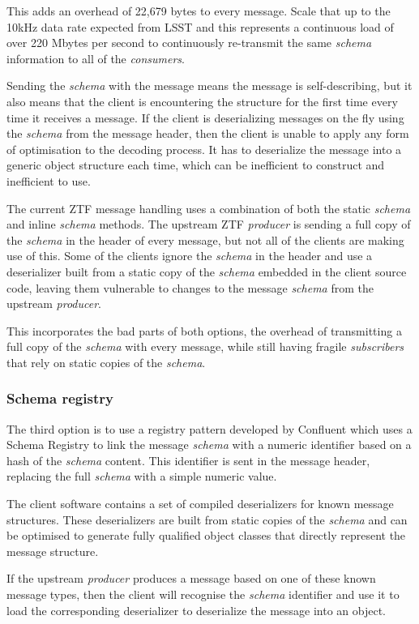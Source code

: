 \documentclass{article}
\newcommand{\kfconsumers} {\textit{consumers}\xspace}
\newcommand{\kfproducer} {\textit{producer}\xspace}
\newcommand{\kfsubscribers} {\textit{subscribers}\xspace}
\newcommand{\confluent} {Confluent\xspace}
\newcommand{\avschema} {\textit{schema}\xspace}
\newcommand{\conschemareg} {registry\xspace}
\newcommand{\conschemaregistry} {Schema Registry\xspace}
\newcommand{\deserz}    {deserialize\xspace}
\newcommand{\deserzer}  {deserializer\xspace}
\newcommand{\deserzers} {deserializers\xspace}
\newcommand{\deserzing} {deserializing\xspace}
\begin{document}
This adds an overhead of 22,679 bytes to every message. Scale that up to the 10kHz data rate expected from LSST and this represents a continuous load of over 220 Mbytes per second to continuously re-transmit the same \avschema information to all of the \kfconsumers.

Sending the \avschema with the message means the message is self-describing, but it also means that the client is encountering the structure for the first time every time it receives a message. If the client is \deserzing messages on the fly using the \avschema from the message header, then the client is unable to apply any form of optimisation to the decoding process. It has to \deserz the message into a generic object structure each time, which can be inefficient to construct and inefficient to use.

The current ZTF message handling uses a combination of both the static \avschema and inline \avschema methods.
The upstream ZTF \kfproducer is sending a full copy of the \avschema in the header of every message, but not all of the clients are making use of this. 
Some of the clients ignore the \avschema in the header and use a \deserzer built from a static copy of the \avschema embedded in the client source code, leaving them vulnerable to changes to the message \avschema from the upstream \kfproducer.

This incorporates the bad parts of both options, the overhead of transmitting a full copy of the \avschema with every message, while still having fragile \kfsubscribers that rely on static copies of the \avschema.

\subsubsection{Schema registry}
\label{avro-schema-registry}

The third option is to use a \conschemareg pattern developed by \confluent which uses a \conschemaregistry to link the message \avschema with a numeric identifier based on a hash of the \avschema content.
This identifier is sent in the message header, replacing the full \avschema with a simple numeric value.

The client software contains a set of compiled \deserzers for known message structures.
These \deserzers are built from static copies of the \avschema and can be optimised to generate fully qualified object classes that directly represent the message structure.

If the upstream \kfproducer produces a message based on one of these known message types, then the client will recognise the \avschema identifier and use it to load the corresponding \deserzer to \deserz the message into an object.
\end{document}

